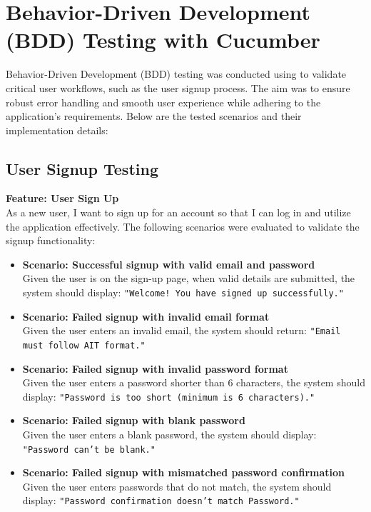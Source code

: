     \newpage
    \section{Behavior-Driven Development (BDD) Testing with Cucumber}
    Behavior-Driven Development (BDD) testing was conducted using \citeauthor{cucumber_bdd} to validate critical user workflows, such as the user signup process. The aim was to ensure robust error handling and smooth user experience while adhering to the application's requirements. Below are the tested scenarios and their implementation details:
    
    \subsection{User Signup Testing}
    
    \textbf{Feature: User Sign Up}\\
    As a new user, I want to sign up for an account so that I can log in and utilize the application effectively. The following scenarios were evaluated to validate the signup functionality:

\begin{itemize}
    \item \textbf{Scenario: Successful signup with valid email and password}\\
    Given the user is on the sign-up page, when valid details are submitted, the system should display: \texttt{"Welcome! You have signed up successfully."}
    
    \item \textbf{Scenario: Failed signup with invalid email format}\\
    Given the user enters an invalid email, the system should return: \texttt{"Email must follow AIT format."}
    
    \item \textbf{Scenario: Failed signup with invalid password format}\\
    Given the user enters a password shorter than 6 characters, the system should display: \texttt{"Password is too short (minimum is 6 characters)."}
    
    \item \textbf{Scenario: Failed signup with blank password}\\
    Given the user enters a blank password, the system should display: \texttt{"Password can't be blank."}
    
    \item \textbf{Scenario: Failed signup with mismatched password confirmation}\\
    Given the user enters passwords that do not match, the system should display: \texttt{"Password confirmation doesn't match Password."}
\end{itemize}

